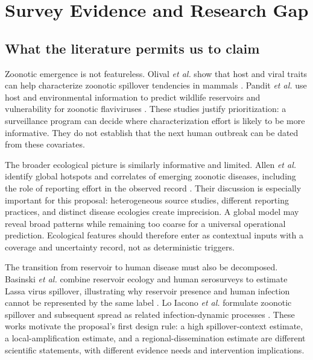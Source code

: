 \documentclass[conference]{IEEEtran}
\begin{document}
\section{Survey Evidence and Research Gap}

\subsection{What the literature permits us to claim}

Zoonotic emergence is not featureless. Olival \emph{et al.} show that host and viral traits can help characterize zoonotic spillover tendencies in mammals \cite{olival2017}. Pandit \emph{et al.} use host and environmental information to predict wildlife reservoirs and vulnerability for zoonotic flaviviruses \cite{pandit2018}. These studies justify prioritization: a surveillance program can decide where characterization effort is likely to be more informative. They do not establish that the next human outbreak can be dated from these covariates.

The broader ecological picture is similarly informative and limited. Allen \emph{et al.} identify global hotspots and correlates of emerging zoonotic diseases, including the role of reporting effort in the observed record \cite{allen2017}. Their discussion is especially important for this proposal: heterogeneous source studies, different reporting practices, and distinct disease ecologies create imprecision. A global model may reveal broad patterns while remaining too coarse for a universal operational prediction. Ecological features should therefore enter as contextual inputs with a coverage and uncertainty record, not as deterministic triggers.

The transition from reservoir to human disease must also be decomposed. Basinski \emph{et al.} combine reservoir ecology and human serosurveys to estimate Lassa virus spillover, illustrating why reservoir presence and human infection cannot be represented by the same label \cite{basinski2021}. Lo Iacono \emph{et al.} formulate zoonotic spillover and subsequent spread as related infection-dynamic processes \cite{loiacono2016}. These works motivate the proposal's first design rule: a high spillover-context estimate, a local-amplification estimate, and a regional-dissemination estimate are different scientific statements, with different evidence needs and intervention implications.
\end{document}

